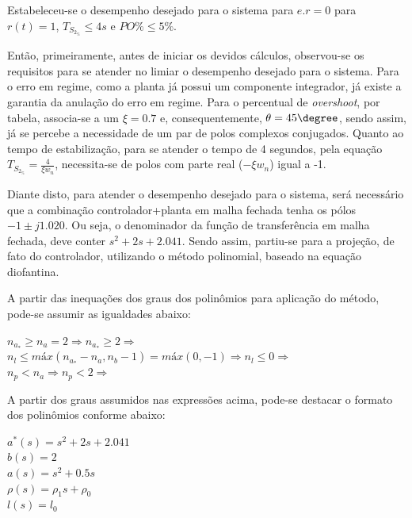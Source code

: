 Estabeleceu-se o desempenho desejado para o sistema para $e.r=0$ para $r(t)=1$, $T_S_2_\% \le 4s$ e $PO\% \le 5\%$.

Então, primeiramente, antes de iniciar os devidos cálculos, observou-se os requisitos para se atender no limiar o desempenho desejado para o sistema. Para o erro em regime, como a planta já possui um componente integrador, já existe a garantia da anulação do erro em regime. Para o percentual de \textit{overshoot}, por tabela, associa-se a um $\xi = 0.7$ e, consequentemente, $\theta = 45\degree$, sendo assim, já se percebe a necessidade de um par de polos complexos conjugados. Quanto ao tempo de estabilização, para se atender o tempo de 4 segundos, pela equação $T_S_2_\% = \frac{4}{\xi w_n}$, necessita-se de polos com parte real ($-\xi w_n$) igual a -1.

Diante disto, para atender o desempenho desejado para o sistema, será necessário que a combinação controlador+planta em malha fechada tenha os pólos $-1 \pm j1.020$. Ou seja, o denominador da função de transferência em malha fechada, deve conter $s^2 + 2s + 2.041$. Sendo assim, partiu-se para a projeção, de fato do controlador, utilizando o método polinomial, baseado na equação diofantina.

A partir das inequações dos graus dos polinômios para aplicação do método, pode-se assumir as igualdades abaixo:

\begin{center}
    $n_a_* \ge n_a = 2 \Rightarrow n_a_* \ge 2 \Rightarrow$  \vspace{5pt}\\
    $n_l \le máx(n_a_* - n_a, n_b - 1) = máx(0, -1) \Rightarrow n_l \le 0 \Rightarrow$  \vspace{5pt}\\
    $n_p < n_a \Rightarrow n_p < 2 \Rightarrow$  \vspace{5pt}
\end{center}

A partir dos graus assumidos nas expressões acima, pode-se destacar o formato dos polinômios conforme abaixo:

\begin{center}
    $a^*(s) = s^2 + 2s + 2.041$ \vspace{5pt}\\
    $b(s) = 2$ \vspace{5pt}\\
    $a(s) = s^2 + 0.5s$ \vspace{5pt}\\
    $\rho(s) = \rho_1s + \rho_0$ \vspace{5pt}\\
    $l(s) = l_0$ \vspace{5pt}
\end{center}

